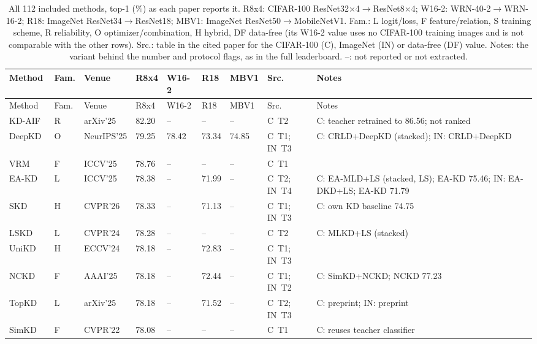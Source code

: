{\scriptsize\setlength{\tabcolsep}{2pt}
\begin{longtable}{@{}lllllll>{\raggedright\arraybackslash}p{1.5cm}>{\raggedright\arraybackslash}p{3.8cm}@{}}
\caption{All 112 included methods, top-1 (\%) as each paper reports it. R8x4: CIFAR-100 ResNet32$\times$4$\to$ResNet8$\times$4; W16-2: WRN-40-2$\to$WRN-16-2; R18: ImageNet ResNet34$\to$ResNet18; MBV1: ImageNet ResNet50$\to$MobileNetV1. Fam.: L logit/loss, F feature/relation, S training scheme, R reliability, O optimizer/combination, H hybrid, DF data-free (its W16-2 value uses no CIFAR-100 training images and is not comparable with the other rows). Src.: table in the cited paper for the CIFAR-100 (C), ImageNet (IN) or data-free (DF) value. Notes: the variant behind the number and protocol flags, as in the full leaderboard. --: not reported or not extracted.}\label{tab:app-methods}\\
\toprule
Method & Fam. & Venue & R8x4 & W16-2 & R18 & MBV1 & Src. & Notes \\
\midrule
\endfirsthead
\toprule
Method & Fam. & Venue & R8x4 & W16-2 & R18 & MBV1 & Src. & Notes \\
\midrule
\endhead
\bottomrule
\endfoot
KD-AIF~\citep{wu2025kdaif} & R & arXiv'25 & 82.20 & -- & -- & -- & C~T2 & C: teacher retrained to 86.56; not ranked \\
DeepKD~\citep{huang2025deepkd} & O & NeurIPS'25 & 79.25 & 78.42 & 73.34 & 74.85 & C~T1; IN~T3 & C: CRLD+DeepKD (stacked); IN: CRLD+DeepKD \\
VRM~\citep{zhang2025vrm} & F & ICCV'25 & 78.76 & -- & -- & -- & C~T1 &  \\
EA-KD~\citep{su2025eakd} & L & ICCV'25 & 78.38 & -- & 71.99 & -- & C~T2; IN~T4 & C: EA-MLD+LS (stacked, LS); EA-KD 75.46; IN: EA-DKD+LS; EA-KD 71.79 \\
SKD~\citep{jeong2026skd} & H & CVPR'26 & 78.33 & -- & 71.13 & -- & C~T1; IN~T3 & C: own KD baseline 74.75 \\
LSKD~\citep{sun2024lskd} & L & CVPR'24 & 78.28 & -- & -- & -- & C~T2 & C: MLKD+LS (stacked) \\
UniKD~\citep{huang2024unikd} & H & ECCV'24 & 78.18 & -- & 72.83 & -- & C~T1; IN~T3 &  \\
NCKD~\citep{zhang2025nckd} & F & AAAI'25 & 78.18 & -- & 72.44 & -- & C~T1; IN~T2 & C: SimKD+NCKD; NCKD 77.23 \\
TopKD~\citep{wang2025topkd} & L & arXiv'25 & 78.18 & -- & 71.52 & -- & C~T2; IN~T3 & C: preprint; IN: preprint \\
SimKD~\citep{chen2022simkd} & F & CVPR'22 & 78.08 & -- & -- & -- & C~T1 & C: reuses teacher classifier \\

\end{longtable}}
